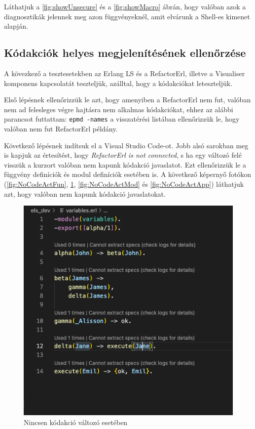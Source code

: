 Láthatjuk a \ref{fig:showUnsecure} és a \ref{fig:showMacro} ábrán, hogy valóban azok a diagnosztikák jelennek meg azon függvényeknél, amit elvárunk a Shell-es kimenet alapján.

\newpage

\subsection{Kódakciók helyes megjelenítésének ellenőrzése} \label{codeactionIntro}

A kövezkező a tesztesetekben az Erlang LS és a RefactorErl, illetve a Visualiser komponens kapcsolatát teszteljük, azálltal, hogy a kódakciókat leteszteljük.


Első lépésnek ellenőrizzük le azt, hogy amenyiben a RefactorErl nem fut, valóban nem ad felesleges végre hajtásra nem alkalmas kódakciókat, ehhez az alábbi parancsot futtattam: \lstinline{epmd -names} a visszatérési listában ellenőrizzük le, hogy valóban nem fut RefactorErl példány. 

Következő lépésnek indítsuk el a Visual Studio Code-ot. Jobb alsó sarokban meg is kapjuk az értesítést, hogy \textit{RefactorErl is not connected}, s ha egy változó felé visszük a kurzort valóban nem kapunk kódakció javaslatot. Ezt ellenőrizzük le a függvény definíciók és modul definíciók esetében is. A következő képernyő fotókon (\ref{fig:NoCodeActFun}, \ref{fig:NoCodeActVar}, \ref{fig:NoCodeActMod} és \ref{fig:NoCodeActApp}) láthatjuk azt, hogy valóban nem kapunk kódakció javaslatokat.


\begin{figure}[H]
  \centering
  \includegraphics[width=0.7\linewidth]{images/testCases/NoCodeActVar.png}
  \caption{Nincsen kódakció változó esetében}
  \label{fig:NoCodeActVar}
\end{figure}

